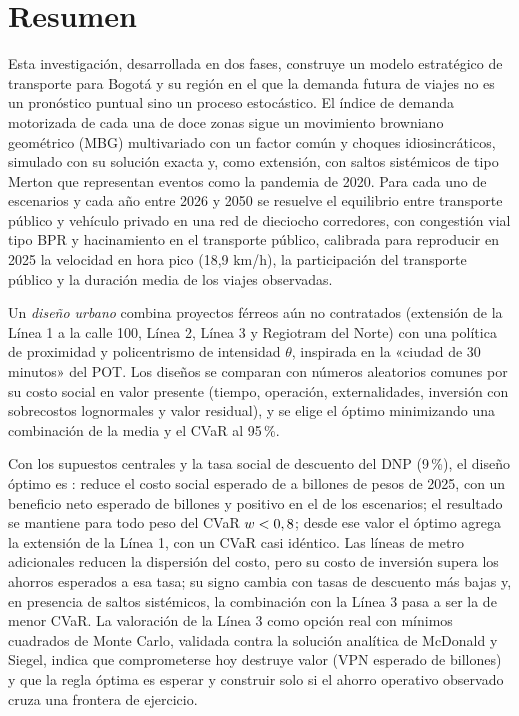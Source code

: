 \chapter*{Resumen}

Esta investigación, desarrollada en dos fases, construye un modelo estratégico de transporte para Bogotá y su región en el que la
demanda futura de viajes no es un pronóstico puntual sino un proceso estocástico. El índice de demanda
motorizada de cada una de doce zonas sigue un movimiento browniano geométrico (MBG) multivariado con un
factor común y choques idiosincráticos, simulado con su solución exacta y, como extensión, con saltos
sistémicos de tipo Merton que representan eventos como la pandemia de 2020. Para cada uno de
\NEscenarios{} escenarios y cada año entre 2026 y 2050 se resuelve el equilibrio entre transporte
público y vehículo privado en una red de dieciocho corredores, con congestión vial tipo BPR y
hacinamiento en el transporte público, calibrada para reproducir en 2025 la velocidad en hora pico
(18,9 km/h), la participación del transporte público y la duración media de los viajes observadas.

Un \emph{diseño urbano} combina proyectos férreos aún no contratados (extensión de la Línea 1 a la
calle 100, Línea 2, Línea 3 y Regiotram del Norte) con una política de proximidad y policentrismo de
intensidad $\theta$, inspirada en la «ciudad de 30 minutos» del POT. Los \NDisenos{} diseños se
comparan con números aleatorios comunes por su costo social en valor presente (tiempo, operación,
externalidades, inversión con sobrecostos lognormales y valor residual), y se elige el óptimo
minimizando una combinación de la media y el CVaR al 95\,\%.

Con los supuestos centrales y la tasa social de descuento del DNP (9\,\%), el diseño óptimo es
\OptimoNeutral: reduce el costo social esperado de \VPBase{} a \VPOptimo{} billones de pesos de 2025,
con un beneficio neto esperado de \BNOptimo{} billones y positivo en el \PBNOptimo{} de los escenarios;
el resultado se mantiene para todo peso del CVaR $w<0,8$; desde ese valor el óptimo agrega la
extensión de la Línea 1, con un CVaR casi idéntico. Las líneas de metro
adicionales reducen la dispersión del costo, pero su costo de inversión supera los ahorros esperados a
esa tasa; su signo cambia con tasas de descuento más bajas y, en presencia de saltos sistémicos, la
combinación con la Línea 3 pasa a ser la de menor CVaR. La valoración de la Línea 3 como opción real
con mínimos cuadrados de Monte Carlo, validada contra la solución analítica de McDonald y Siegel,
indica que comprometerse hoy destruye valor (VPN esperado de \OpcionAhora{} billones) y que la regla
óptima es esperar y construir solo si el ahorro operativo observado cruza una frontera de ejercicio.

